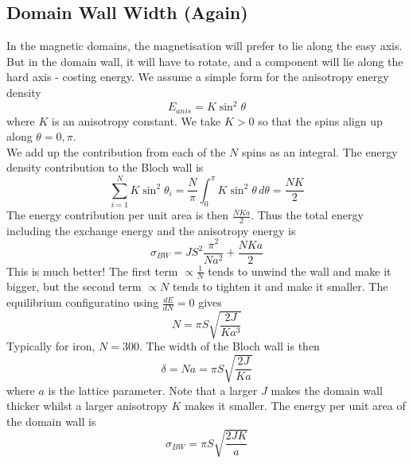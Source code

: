 \documentclass[a4paper, 11pt, normalem]{report}
\begin{document}
\section{Domain Wall Width (Again)}
In the magnetic domains, the magnetisation will prefer to lie along the easy axis. 
But in the domain wall, it will have to rotate, and a component will lie along the hard axis - costing energy. 
We assume a simple form for the anisotropy energy density
\begin{equation}
    E_{anis} = K\sin^2\theta
\end{equation}
where $K$ is an anisotropy constant.
We take $K>0$ so that the spins align up along $\theta=0,\pi$.\\
We add up the contribution from each of the $N$ spins as an integral.
The energy density contribution to the Bloch wall is 
\begin{equation}
    \sum_{i=1}^N K\sin^2\theta_i = \frac{N}{\pi} \int_0^\pi K\sin^2\theta\,d\theta = \frac{NK}{2}
\end{equation}
The energy contribution per unit area is then $\frac{NKa}{2}$.
Thus the total energy including the exchange energy and the anisotropy energy is
\begin{equation}
    \sigma_{BW} = JS^2\frac{\pi^2}{Na^2} + \frac{NKa}{2}
\end{equation}
This is much better!
The first term $\propto \frac{1}{N}$ tends to unwind the wall and make it bigger, but the second term $\propto N$ tends to tighten it and make it smaller. 
The equilibrium configuratino using $\frac{dE}{dN} = 0$ gives
\begin{equation}
    N = \pi S\sqrt{\frac{2J}{Ka^3}}
\end{equation}
Typically for iron, $N=300$. 
The width of the Bloch wall is then
\begin{equation}
    \delta = Na = \pi S\sqrt{\frac{2J}{Ka}}
\end{equation}
where $a$ is the lattice parameter. 
Note that a larger $J$ makes the domain wall thicker whilst a larger anisotropy $K$ makes it smaller. 
The energy per unit area of the domain wall is 
\begin{equation}
    \sigma_{BW} = \pi S\sqrt{\frac{2JK}{a}}
\end{equation}

\chapter{}
\end{document}
